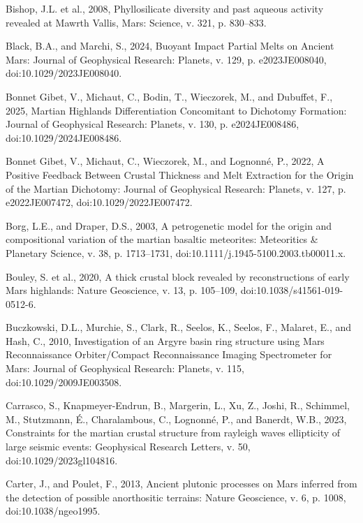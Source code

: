 \documentclass[11pt]{article}
\begin{document}
\begin{thebibliography}{99}
 Bishop, J.L. et al., 2008, Phyllosilicate diversity and past aqueous activity revealed at Mawrth Vallis, Mars: Science, v. 321, p. 830--833.

 Black, B.A., and Marchi, S., 2024, Buoyant Impact Partial Melts on Ancient Mars: Journal of Geophysical Research: Planets, v. 129, p. e2023JE008040, doi:10.1029/2023JE008040.

 Bonnet Gibet, V., Michaut, C., Bodin, T., Wieczorek, M., and Dubuffet, F., 2025, Martian Highlands Differentiation Concomitant to Dichotomy Formation: Journal of Geophysical Research: Planets, v. 130, p. e2024JE008486, doi:10.1029/2024JE008486.

 Bonnet Gibet, V., Michaut, C., Wieczorek, M., and Lognonné, P., 2022, A Positive Feedback Between Crustal Thickness and Melt Extraction for the Origin of the Martian Dichotomy: Journal of Geophysical Research: Planets, v. 127, p. e2022JE007472, doi:10.1029/2022JE007472.

 Borg, L.E., and Draper, D.S., 2003, A petrogenetic model for the origin and compositional variation of the martian basaltic meteorites: Meteoritics \& Planetary Science, v. 38, p. 1713--1731, doi:10.1111/j.1945-5100.2003.tb00011.x.

 Bouley, S. et al., 2020, A thick crustal block revealed by reconstructions of early Mars highlands: Nature Geoscience, v. 13, p. 105--109, doi:10.1038/s41561-019-0512-6.

 Buczkowski, D.L., Murchie, S., Clark, R., Seelos, K., Seelos, F., Malaret, E., and Hash, C., 2010, Investigation of an Argyre basin ring structure using Mars Reconnaissance Orbiter/Compact Reconnaissance Imaging Spectrometer for Mars: Journal of Geophysical Research: Planets, v. 115, doi:10.1029/2009JE003508.

 Carrasco, S., Knapmeyer-Endrun, B., Margerin, L., Xu, Z., Joshi, R., Schimmel, M., Stutzmann, É., Charalambous, C., Lognonné, P., and Banerdt, W.B., 2023, Constraints for the martian crustal structure from rayleigh waves ellipticity of large seismic events: Geophysical Research Letters, v. 50, doi:10.1029/2023gl104816.

 Carter, J., and Poulet, F., 2013, Ancient plutonic processes on Mars inferred from the detection of possible anorthositic terrains: Nature Geoscience, v. 6, p. 1008, doi:10.1038/ngeo1995.


\end{thebibliography}
\end{document}
